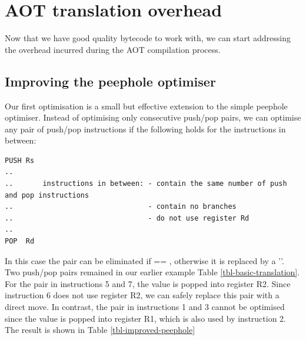 \section{AOT translation overhead}
\label{sec-optimisations-aot-translation-overhead}
Now that we have good quality bytecode to work with, we can start addressing the overhead incurred during the AOT compilation process.

\subsection{Improving the peephole optimiser}
\label{sec-improved-peephole}


Our first optimisation is a small but effective extension to the simple peephole optimiser. Instead of optimising only consecutive push/pop pairs, we can optimise any pair of push/pop instructions if the following holds for the instructions in between:

\begin{listing}[H]
 \centering
 \begin{verbatim}
PUSH Rs
..
..       instructions in between: - contain the same number of push and pop instructions
..                                - contain no branches
..                                - do not use register Rd
..
POP  Rd
 \end{verbatim}
\end{listing}

In this case the pair can be eliminated if  == , otherwise it is replaced by a ''. Two push/pop pairs remained in our earlier example Table \ref{tbl-basic-translation}. For the pair in instructions 5 and 7, the value is popped into register R2. Since instruction 6 does not use register R2, we can safely replace this pair with a direct move. In contrast, the pair in instructions 1 and 3 cannot be optimised since the value is popped into register R1, which is also used by instruction 2. The result is shown in Table \ref{tbl-improved-peephole}

